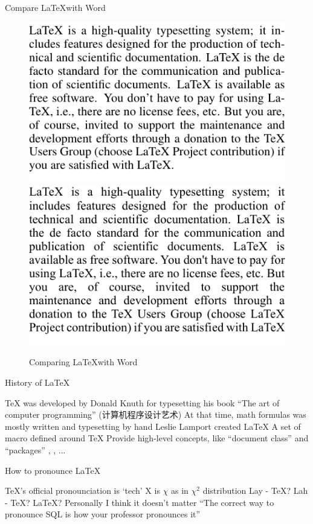\documentclass[scheme=plain,aspectratio=169]{ctexbeamer}
\let\OriginLaTeX\LaTeX
\renewcommand\LaTeX{\textrm{\OriginLaTeX\xspace}}
\begin{document}
\begin{frame}{Compare \LaTeX with Word}
    \begin{figure}
        \centering
        \includegraphics[width=.4\linewidth]{knuth-line-breaking-demo.pdf} %
        \hspace{1cm}
        \includegraphics[width=.4\linewidth]{knuth-line-breaking-demo-word.pdf}
        \caption{Comparing \LaTeX with Word}
    \end{figure}
\end{frame}

\begin{frame}{History of \LaTeX}
    \begin{outline}
        \1 \textrm{\TeX} was developed by Donald Knuth for typesetting his book ``The art of computer programming''
        \ifbjut (计算机程序设计艺术) \fi
            \2 At that time, math formulas was mostly written and typesetting by hand
        \1 Leslie Lamport created \LaTeX
            \2 A set of macro defined around \textrm{\TeX}
            \2 Provide high-level concepts, like ``document class'' and ``packages''
        \1 \textrm{\XeLaTeX, \LuaLaTeX}, ...
    \end{outline}
\end{frame}

\begin{frame}{How to pronounce \LaTeX}
    \begin{outline}
        \1 TeX's official pronounciation is `tech'
            \2 X is $\chi$ as in $\chi^2$ distribution
        \1 Lay - TeX?
        \1 Lah - TeX?
        \1 LaTeX?
        \1 Personally I think it doesn't matter
            \2 ``The correct way to pronounce SQL is how your professor pronounces it''
    \end{outline}
\end{frame}
\end{document}
